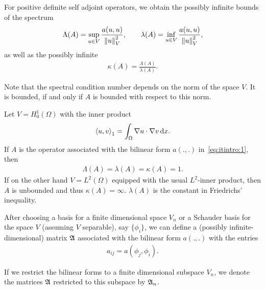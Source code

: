 \begin{definition}
  For positive definite self adjoint operators, we obtain the possibly
  infinite bounds of the spectrum
  \begin{gather}
    \label{eq:richardson:8}
    \Lambda(A) = \sup_{u\in V}\frac{a(u,u)}{\left\|u\right\|_V^2},
    \qquad
    \lambda(A) = \inf_{u\in V}\frac{a(u,u)}{\left\|u\right\|_V^2},
  \end{gather}
  as well as the possibly infinite 
  \begin{gather*}
   \kappa(A) = \frac{\Lambda(A)}{\lambda(A)}.
  \end{gather*}
\end{definition}

\begin{note}
  Note that the spectral condition number depends on the norm of the
  space $V$. It is bounded, if and only if $A$ is bounded with respect
  to this norm.
\end{note}

\begin{example}
  Let $V=H^1_0(\Omega)$ with the inner product
  \begin{gather*}
    \scal(u,v)_1 = \int_\Omega \nabla u\cdot \nabla v \dx.  
  \end{gather*}
  If $A$ is the operator associated with the bilinear form $a(.,.)$
  in~\eqref{eq:itintro:1}, then 
  \begin{gather*}
    \Lambda(A) = \lambda(A) = \kappa(A) = 1.    
  \end{gather*}
  If on the other hand $V = L^2(\Omega)$ equipped with the usual
  $L^2$-inner product, then $A$ is unbounded and thus $\kappa(A) =
  \infty$. $\lambda(A)$ is the constant in Friedrichs' inequality.
\end{example}

\begin{notation}
  After choosing a basis for a finite dimensional space $V_n$ or a
  Schauder basis for the space $V$ (assuming $V$ separable), say
  $\{\phi_i\}$, we can define a (possibly infinite-dimensional) matrix
  $\mathfrak{A}$ associated with the bilinear form $a(.,.)$ with the entries
  \begin{gather*}
    a_{i j} = a(\phi_j, \phi_i).
  \end{gather*}
  
  If we restrict the bilinear forms to a finite dimensional subspace
  $V_n$, we denote the matrices $\mathfrak{A}$ restricted to this subspace
  by $\mathfrak{A}_n$.
\end{notation}


